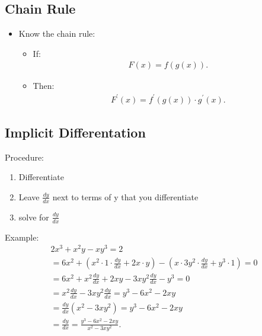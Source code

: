 \documentclass{report}
\begin{document}
    \bigbreak \noindent \bigbreak \noindent 
    \subsection{Chain Rule}
    \begin{itemize}
      \item Know the chain rule:
        \begin{itemize}
          \item If:
        \begin{align*}
          F(x) = f(g(x))
        .\end{align*}
        \item Then:
        \begin{align*}
          F^{\prime}(x) = f^{\prime}(g(x)) \cdot g^{\prime}(x)
        .\end{align*}
        \end{itemize}
    \end{itemize}

    \pagebreak \bigbreak \noindent
    \subsection{Implicit Differentation}
    \bigbreak \noindent 
    Procedure:
    \begin{enumerate}
      \item Differentiate
      \item Leave $\frac{dy}{dx}$ next to terms of y that you differentiate
      \item solve for $\frac{dy}{dx}$
    \end{enumerate}
    \bigbreak \noindent \bigbreak \noindent 
    Example:
    \begin{align*}
      2x^{3}  +x^{2}y-xy^{3} =2 \\
      =     6x^{2} + (x^{2} \cdot 1\cdot \frac{dy}{dx} + 2x \cdot y) - (x \cdot 3y^{2} \cdot \frac{dy}{dx} +y^{3}\cdot 1) =  0 \\
         =  6x^{2} + x^{2}\frac{dy}{dx}+2xy - 3xy^{2}\frac{dy}{dx}- y^{3} = 0 \\
         =    x^{2}\frac{dy}{dx}-3xy^{2}\frac{dy}{dx} = y^{3}-6x^{2}-2xy \\
         =     \frac{dy}{dx}(x^{2}-3xy^{2}) = y^{3} - 6x^{2} - 2xy \\
         =    \frac{dy}{dx} = \frac{y^{3}-6x^{2}-2xy}{x^{2}-3xy^{2}} 
    .\end{align*}

    \bigbreak \noindent \bigbreak \noindent 
\end{document}
